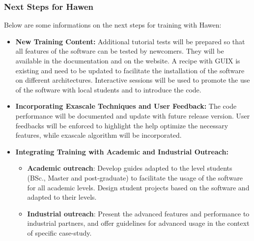 \subsubsection{Next Steps for Hawen}
\label{sec:Hawen:next-steps}

Below are some informations on the next steps for training with Hawen:

\begin{itemize}
    \item \textbf{New Training Content:} 
    Additional tutorial tests will be prepared so that all features 
    of the software can be tested by newcomers. They will be available
    in the documentation and on the website.
    A recipe with GUIX is existing and need to be updated to facilitate 
    the installation of the software on different architectures.
    Interactive sessions will be used to promote the use of the software with 
    local students and to introduce the code.

    \item \textbf{Incorporating Exascale Techniques and User Feedback:}
    The code performance will be documented and update with future release version.
    User feedbacks will be enforced to highlight the help optimize the necessary 
    features, while exascale algorithm will be incorporated.
    
    \item \textbf{Integrating Training with Academic and Industrial Outreach:}
    \begin{itemize}
      \item \textbf{Academic outreach}: 
             Develop guides adapted to the level students (BSc., Master and post-graduate) 
             to facilitate the usage of the software for all academic levels. 
             Design student projects based on the software and adapted to their levels.
      \item \textbf{Industrial outreach}:
             Present the advanced features and performance to industrial partners,
             and offer guidelines for advanced usage in the context of specific
             case-study.
    \end{itemize}
          
\end{itemize}
